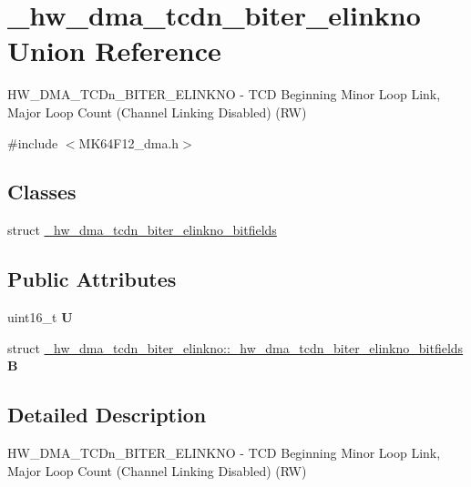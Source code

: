 \hypertarget{union__hw__dma__tcdn__biter__elinkno}{}\section{\+\_\+hw\+\_\+dma\+\_\+tcdn\+\_\+biter\+\_\+elinkno Union Reference}
\label{union__hw__dma__tcdn__biter__elinkno}


H\+W\+\_\+\+D\+M\+A\+\_\+\+T\+C\+Dn\+\_\+\+B\+I\+T\+E\+R\+\_\+\+E\+L\+I\+N\+K\+NO -\/ T\+CD Beginning Minor Loop Link, Major Loop Count (Channel Linking Disabled) (RW)  




{\ttfamily \#include $<$M\+K64\+F12\+\_\+dma.\+h$>$}

\subsection*{Classes}
\begin{DoxyCompactItemize}
\item 
struct \hyperlink{struct__hw__dma__tcdn__biter__elinkno_1_1__hw__dma__tcdn__biter__elinkno__bitfields}{\+\_\+hw\+\_\+dma\+\_\+tcdn\+\_\+biter\+\_\+elinkno\+\_\+bitfields}
\end{DoxyCompactItemize}
\subsection*{Public Attributes}
\begin{DoxyCompactItemize}
\item 
uint16\+\_\+t {\bfseries U}\hypertarget{union__hw__dma__tcdn__biter__elinkno_a981323af3ad6d52c6abb2e8ab81dbba5}{}\label{union__hw__dma__tcdn__biter__elinkno_a981323af3ad6d52c6abb2e8ab81dbba5}

\item 
struct \hyperlink{struct__hw__dma__tcdn__biter__elinkno_1_1__hw__dma__tcdn__biter__elinkno__bitfields}{\+\_\+hw\+\_\+dma\+\_\+tcdn\+\_\+biter\+\_\+elinkno\+::\+\_\+hw\+\_\+dma\+\_\+tcdn\+\_\+biter\+\_\+elinkno\+\_\+bitfields} {\bfseries B}\hypertarget{union__hw__dma__tcdn__biter__elinkno_a612c102302edecaf53dfb1997223e342}{}\label{union__hw__dma__tcdn__biter__elinkno_a612c102302edecaf53dfb1997223e342}

\end{DoxyCompactItemize}


\subsection{Detailed Description}
H\+W\+\_\+\+D\+M\+A\+\_\+\+T\+C\+Dn\+\_\+\+B\+I\+T\+E\+R\+\_\+\+E\+L\+I\+N\+K\+NO -\/ T\+CD Beginning Minor Loop Link, Major Loop Count (Channel Linking Disabled) (RW) 

